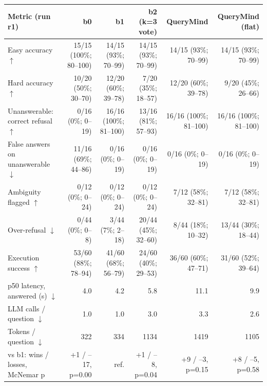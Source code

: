 \begin{tabular}{lrrrrr}
\toprule
Metric (run r1) & b0 & b1 & b2 (k=3 vote) & QueryMind & QueryMind (flat) \\
\midrule
Easy accuracy $\uparrow$ & 15/15 (100\%; 80–100) & 14/15 (93\%; 70–99) & 14/15 (93\%; 70–99) & 14/15 (93\%; 70–99) & 14/15 (93\%; 70–99) \\
Hard accuracy $\uparrow$ & 10/20 (50\%; 30–70) & 12/20 (60\%; 39–78) & 7/20 (35\%; 18–57) & 12/20 (60\%; 39–78) & 9/20 (45\%; 26–66) \\
Unanswerable: correct refusal $\uparrow$ & 0/16 (0\%; 0–19) & 16/16 (100\%; 81–100) & 13/16 (81\%; 57–93) & 16/16 (100\%; 81–100) & 16/16 (100\%; 81–100) \\
False answers on unanswerable $\downarrow$ & 11/16 (69\%; 44–86) & 0/16 (0\%; 0–19) & 0/16 (0\%; 0–19) & 0/16 (0\%; 0–19) & 0/16 (0\%; 0–19) \\
Ambiguity flagged $\uparrow$ & 0/12 (0\%; 0–24) & 0/12 (0\%; 0–24) & 0/12 (0\%; 0–24) & 7/12 (58\%; 32–81) & 7/12 (58\%; 32–81) \\
Over-refusal $\downarrow$ & 0/44 (0\%; 0–8) & 3/44 (7\%; 2–18) & 20/44 (45\%; 32–60) & 8/44 (18\%; 10–32) & 13/44 (30\%; 18–44) \\
Execution success $\uparrow$ & 53/60 (88\%; 78–94) & 41/60 (68\%; 56–79) & 24/60 (40\%; 29–53) & 36/60 (60\%; 47–71) & 31/60 (52\%; 39–64) \\
p50 latency, answered (s) $\downarrow$ & 4.0 & 4.2 & 5.8 & 11.1 & 9.9 \\
LLM calls / question $\downarrow$ & 1.0 & 1.0 & 3.0 & 3.3 & 2.6 \\
Tokens / question $\downarrow$ & 322 & 334 & 1134 & 1419 & 1105 \\
vs b1: wins / losses, McNemar p & +1 / --17, p=0.00 & ref. & +1 / --8, p=0.04 & +9 / --3, p=0.15 & +8 / --5, p=0.58 \\
\bottomrule
\end{tabular}
